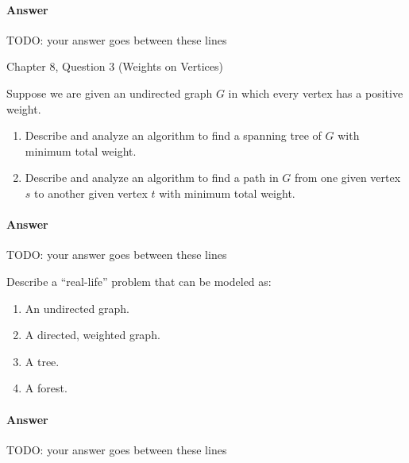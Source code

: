 \documentclass{article}
\begin{document}
\paragraph{Answer}


TODO: your answer goes between these lines



\nextprob
{}

Chapter 8, Question 3 (Weights on Vertices)

Suppose we are given an undirected graph $G$ in which every vertex has a positive weight.
\begin{enumerate}[label=(\alph*)]
    \item Describe and analyze an algorithm to find a spanning tree of $G$ with minimum total weight.
    \item Describe and analyze an algorithm to find a path in $G$ from one given vertex $s$ to another given vertex $t$ with minimum total weight.
\end{enumerate}

\paragraph{Answer}


TODO: your answer goes between these lines





\nextprob
{}

Describe a ``real-life'' problem that can be modeled as:

\begin{enumerate}
    \item An undirected graph.
    \item A directed, weighted graph.
    \item A tree.
    \item A forest.
\end{enumerate}

\paragraph{Answer}


TODO: your answer goes between these lines
\end{document}
